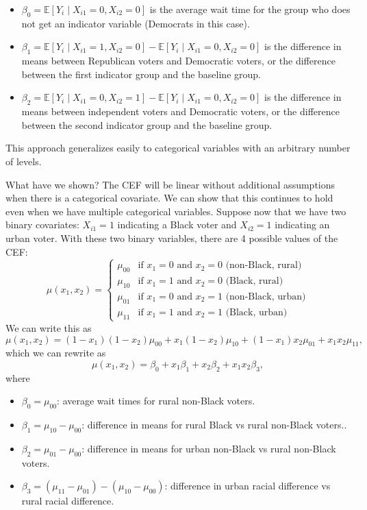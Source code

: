 \documentclass[
  letterpaper,
  DIV=11,
  numbers=noendperiod]{scrreprt}
\providecommand{\tightlist}{%
  \setlength{\itemsep}{0pt}\setlength{\parskip}{0pt}}\usepackage{longtable,booktabs,array}
\newcommand{\E}{\mathbb{E}}
\theoremstyle{definition}
\theoremstyle{plain}
\theoremstyle{definition}
\theoremstyle{remark}
\begin{document}
\begin{itemize}
\tightlist
\item
  \(\beta_0 = \E[Y_{i} \mid X_{i1} = 0, X_{i2} = 0]\) is the average
  wait time for the group who does not get an indicator variable
  (Democrats in this case).
\item
  \(\beta_1 = \E[Y_{i} \mid X_{i1} = 1, X_{i2} = 0] - \E[Y_{i} \mid X_{i1} = 0, X_{i2} = 0]\)
  is the difference in means between Republican voters and Democratic
  voters, or the difference between the first indicator group and the
  baseline group.
\item
  \(\beta_2 = \E[Y_{i} \mid X_{i1} = 0, X_{i2} = 1] - \E[Y_{i} \mid X_{i1} = 0, X_{i2} = 0]\)
  is the difference in means between independent voters and Democratic
  voters, or the difference between the second indicator group and the
  baseline group.
\end{itemize}

This approach generalizes easily to categorical variables with an
arbitrary number of levels.

What have we shown? The CEF will be linear without additional
assumptions when there is a categorical covariate. We can show that this
continues to hold even when we have multiple categorical variables.
Suppose now that we have two binary covariates: \(X_{i1}=1\) indicating
a Black voter and \(X_{i2} = 1\) indicating an urban voter. With these
two binary variables, there are 4 possible values of the CEF: \[ 
\mu(x_1, x_2) = \begin{cases} 
 \mu_{00} & \text{if } x_1 = 0 \text{ and } x_2 = 0 \text{ (non-Black, rural)} \\
  \mu_{10} & \text{if }  x_1 = 1 \text{ and } x_2 = 0 \text{ (Black, rural)}\\
  \mu_{01} & \text{if }  x_1 = 0 \text{ and } x_2 = 1 \text{ (non-Black, urban)}\\
 \mu_{11} & \text{if }  x_1 = 1 \text{ and } x_2 = 1 \text{ (Black, urban)}
 \end{cases}
\] We can write this as \[ 
\mu(x_{1}, x_{2}) = (1 - x_{1})(1 - x_{2})\mu_{00} + x_{1}(1 -x_{2})\mu_{10} + (1-x_{1})x_{2}\mu_{01} + x_{1}x_{2}\mu_{11},
\] which we can rewrite as \[ 
\mu(x_1, x_2) = \beta_0 + x_1\beta_1 + x_2\beta_2 + x_1x_2\beta_3,
\] where

\begin{itemize}
\tightlist
\item
  \(\beta_0 = \mu_{00}\): average wait times for rural non-Black voters.
\item
  \(\beta_1 = \mu_{10} - \mu_{00}\): difference in means for rural Black
  vs rural non-Black voters..
\item
  \(\beta_2 = \mu_{01} - \mu_{00}\): difference in means for urban
  non-Black vs rural non-Black voters.
\item
  \(\beta_3 = (\mu_{11} - \mu_{01}) - (\mu_{10} - \mu_{00})\):
  difference in urban racial difference vs rural racial difference.
\end{itemize}
\end{document}
